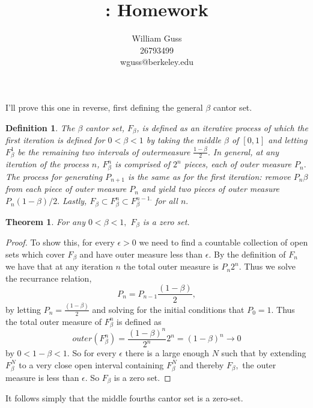 \documentclass[letter]{article}
\title{\bFLASS: Homework \bHWN}
\author{William Guss\\26793499\\wguss@berkeley.edu}
\newtheorem{theorem}{Theorem}
\newtheorem{definition}{Definition}
\newenvironment{menumerate}{%
  \edef\backupindent{\the\parindent}%
  \enumerate%
  \setlength{\parindent}{\backupindent}%
}{\endenumerate}
\begin{document}
\maketitle
\thispagestyle{empty}


\begin{menumerate}


\setcounter{enumi}{29}
	\item I'll prove this one in reverse, first defining the general $\beta$ cantor set.
	\begin{definition}
		The $\beta$ cantor set, $F_\beta$, is defined as an iterative process of which the first iteration is defined for $0 < \beta < 1$ by taking the middle $\beta$ of $[0,1]$ and letting $F^1_\beta$ be the remaining two intervals of outermeasure $\frac{1-\beta}{2}.$ In general, at any iteration of the process $n$, $F^n_\beta$ is comprised of $2^n$ pieces, each of outer measure $P_n.$ The process for generating $P_{n+1}$ is the same as for the first iteration: remove $P_n\beta$ from each piece of outer measure $P_n$ and yield two pieces of outer measure $P_n(1-\beta)/2.$ Lastly, $F_\beta \subset F_\beta^n\subset F_\beta^{n-1.}$ for all $n.$
	\end{definition}

	\begin{theorem}
		For any $0 < \beta < 1,$ $F_\beta$ is a zero set.
	\end{theorem}
	\begin{proof}
	To show this, for every $\epsilon > 0$ we need to find a countable collection of open sets which cover $F_\beta$ and have outer measure less than $\epsilon.$ By the definition of $F_n$ we have that at any iteration $n$ the total outer measure is $P_n2^n.$ Thus we solve the recurrance relation, $$P_n = P_{n-1}\frac{(1-\beta)}{2},$$ by letting $P_n = \frac{(1-\beta)}{2}$ and solving for the initial conditions that $P_0 = 1.$ Thus the total outer measure of $F^n_\beta$ is defined as 
	$$outer(F^n_\beta) = \frac{(1-\beta)^n}{2^n}2^n = (1-\beta)^n \to 0$$
	by $0<1-\beta<1.$ So for every $\epsilon$ there is a large enough $N$ such that by extending $F_\beta^N$ to a very close open interval containing $F_\beta^N$ and thereby $F_\beta,$ the outer measure is less than $\epsilon.$ So $F_\beta$ is a zero set.
	\end{proof}

	It follows simply that the middle fourths cantor set is a zero-set.


\end{menumerate}
\end{document}
